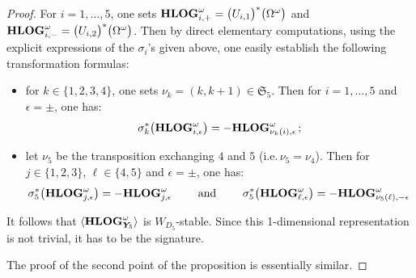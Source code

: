 \documentclass[10pt,a4paper]{amsart}
\begin{document}
\begin{proof}%
For $i=1,\ldots,5$, one 
sets $ {\bf HLOG}_{i,+}^{\omega}=
\big({U_{i,1}}\big)^*\big( \Omega^\omega
\big)$  and $
{\bf HLOG}_{i,-}^{\omega}=
\big({U_{i,2}}\big)^*\big( \Omega^\omega
\big)
$. 
Then by direct elementary computations, using the explicit expressions of the $\sigma_i$'s given above, 
one easily establish the following transformation formulas: 
\begin{itemize}
\item for $k\in \{1,2,3,4\}$, one sets $\nu_k=(k,k+1)\in \mathfrak S_5$. Then 
for $ i=1,\ldots,5$  and 
$\epsilon=\pm$, 
one has: 
\begin{equation}
\label{Eq:Transfoformulas_1}
\sigma_k^*\big( {\bf HLOG}_{i,\epsilon}^{\omega} \big) =- 
{\bf HLOG}_{\nu_k(i),\epsilon}^{\omega} \, ; 
\end{equation}
\item let $\nu_5$ be the transposition exchanging $4$ and $5$ (i.e.\,$\nu_5=\nu_4$). Then 
for $j\in \{1,2,3\}$, $\ell\in \{4,5\}$ and $\epsilon=\pm$, 
one has:
\begin{equation}
\label{Eq:Transfoformulas_2}
\sigma_5^*\big( {\bf HLOG}_{j,\epsilon}^{\omega} \big)=-
{\bf HLOG}_{j,\epsilon}^{\omega} 
\qquad \mbox{ and } \qquad 
\sigma_5^*\big( {\bf HLOG}_{\ell,\epsilon}^{\omega} \big)=-
{\bf HLOG}_{\nu_5(\ell),-\epsilon}^{\omega} \, 
\end{equation}
\end{itemize}
It follows that $\langle {\bf HLOG}_{\boldsymbol{Y}_5}^{\omega}\rangle$ is $W_{D_5}$-stable. Since this 1-dimensional representation is not trivial, it has to be the signature. 

The proof of the second point of the proposition 
is essentially similar. 
\end{proof}%
\end{document}
